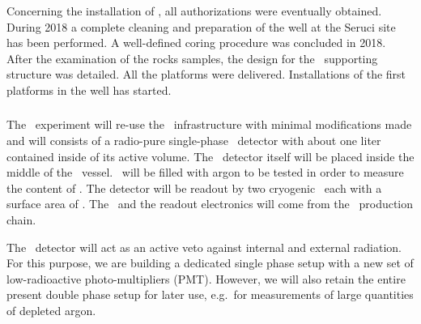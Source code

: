
Concerning the installation of \SeruciOne, all  authorizations were eventually obtained.  During  2018 a complete cleaning and preparation of the well at the Seruci site has been performed.  A well-defined coring procedure was concluded in 2018. After the examination of the rocks samples, the design for the \SeruciOne\ supporting structure was detailed. All the platforms were delivered. Installations of the first platforms in the well has started.

\subsubsection{\DArT} 
The \DArT\ experiment will re-use the \ArDM\ infrastructure with minimal modifications made and will consists of a radio-pure single-phase \LAr\ detector with about one liter contained inside of its active volume.  The \DArT\ detector itself will be placed inside the middle of the \ArDM\ vessel.  \DArT\ will be filled with argon to be tested in order to measure the content of .  The detector will be readout by two cryogenic \SiPMs\ each with a surface area of \DSkSiPMAreaMaxcm.  The \SiPMs\ and the readout electronics will come from the \DSks\ production chain. 

The \ArDM\ detector will act as an active veto against internal and external radiation. For this purpose, we are building a dedicated single phase setup with a new set of low-radioactive photo-multipliers (PMT). However, we will also retain the entire present double phase setup for later use, e.g.~for measurements of large quantities of depleted argon.

